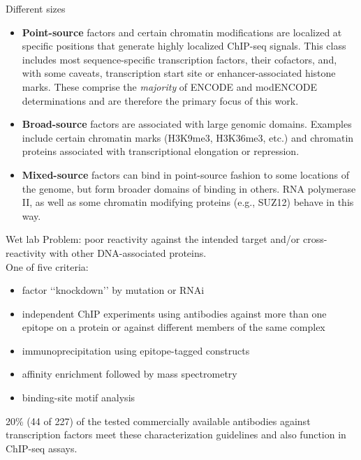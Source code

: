 \documentclass{beamer}
\begin{document}
\begin{frame}{Different sizes}
\begin{itemize}
\item \textbf{Point-source} factors and certain chromatin modifications are localized at specific positions that generate highly localized ChIP-seq signals. This class includes most sequence-specific transcription factors, their cofactors, and, with some caveats, transcription start site or enhancer-associated histone marks. These comprise the \textit{majority} of ENCODE and modENCODE determinations and are therefore the primary focus of this work.
\item \textbf{Broad-source} factors are associated with large genomic domains. Examples include certain chromatin marks (H3K9me3, H3K36me3, etc.) and chromatin proteins associated with transcriptional elongation or repression.
\item \textbf{Mixed-source} factors can bind in point-source fashion to some locations of the genome, but form broader domains of binding in others. RNA polymerase II, as well as some chromatin modifying proteins (e.g., SUZ12) behave in this way.
\end{itemize}
\end{frame}



\begin{frame}{Wet lab}
Problem: poor reactivity against the intended target and/or cross-reactivity with other DNA-associated proteins.\\
One of five criteria:
\begin{itemize}
\item factor ‘‘knockdown’’ by mutation or RNAi
\item independent ChIP experiments using antibodies against more than one epitope on a protein or against different members of the same complex
\item immunoprecipitation using epitope-tagged constructs
\item affinity enrichment followed by mass spectrometry
\item binding-site motif analysis
\end{itemize}
20\% (44 of 227) of the tested commercially available antibodies against transcription factors meet these characterization guidelines and also function in ChIP-seq assays.
\end{frame}
\end{document}
